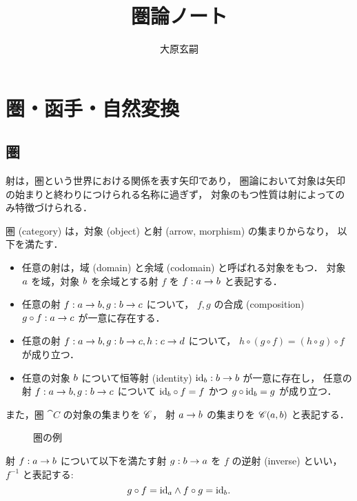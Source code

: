 \documentclass[titlepage]{ltjsreport}
\title{圏論ノート}
\author{大原玄嗣}
\begin{document}
\maketitle
\tableofcontents

\chapter{圏・函手・自然変換}

\section{圏}

射は，圏という世界における関係を表す矢印であり，
圏論において対象は矢印の始まりと終わりにつけられる名称に過ぎず，
対象のもつ性質は射によってのみ特徴づけられる．

\begin{definition}[圏]\label{def:category}
  \def\a{\obj{a}}%
  \def\b{\obj{b}}%
  \def\c{\obj{c}}%
  \def\d{\obj{d}}%
  圏 (category) は，対象 (object) と射 (arrow, morphism) の集まりからなり，
  以下を満たす．
  \begin{itemize}
    \item 任意の射は，域 (domain) と余域 (codomain) と呼ばれる対象をもつ．
          対象 $\a$ を域，対象 $\b$ を余域とする射 $f$ を
          $\mrp{f}{\a}{\b}$ と表記する．
    \item 任意の射 $\mrp{f}{\a}{\b},\mrp{g}{\b}{\c}$ について，
          $f,g$ の合成 (composition) $\mrp{g\circ f}{\a}{\c}$
          が一意に存在する．
    \item 任意の射 $\mrp{f}{\a}{\b},\mrp{g}{\b}{\c},\mrp{h}{\c}{\d}$ について，
          $h\circ(g\circ f)=(h\circ g)\circ f$ が成り立つ．
    \item 任意の対象 $\b$ について恒等射 (identity)
          $\mrp{\id{\b}}{\b}{\b}$ が一意に存在し，
          任意の射 $\mrp{f}{\a}{\b},\mrp{g}{\b}{\c}$ について
          $\id{\b}\circ f=f$ かつ $g\circ\id{\b}=g$ が成り立つ．
  \end{itemize}
  また，圏 $\cat{C}$ の対象の集まりを $\mathscr{C}$，
  射 $\a\to\b$ の集まりを $\mrps{\cat{C}}{\a}{\b}$ と表記する．
\end{definition}

\begin{figure}[htbp]
  \centering
  
  \caption{圏の例}
\end{figure}

\begin{definition}[逆射]
  \def\a{\obj{a}}%
  \def\b{\obj{b}}%
  射 $\mrp{f}{\a}{\b}$ について以下を満たす射 $\mrp{g}{\b}{\a}$ を
  $f$ の逆射 (inverse) といい，
  $f^{-1}$ と表記する:
  \begin{equation}
    g\circ f=\id{\a}\wedge f\circ g=\id{\b}.
  \end{equation}
\end{definition}
\end{document}
